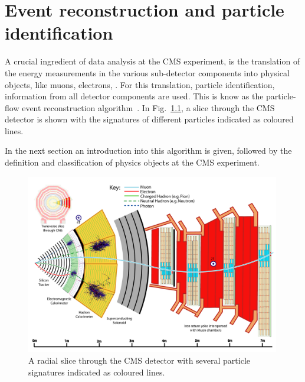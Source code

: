 \chapter{Event reconstruction and particle identification}
A crucial ingredient of data analysis at the CMS experiment, is the translation of the energy measurements in the various sub-detector components into physical objects, like muons, electrons, \etc.
For this translation, \ie particle identification, information from all detector components are used.
This is know as the particle-flow event reconstruction algorithm~\cite{CMS-PAS-PFT-09-001}.
In Fig.~\ref{fig:CMSslice}, a slice through the CMS detector is shown with the signatures of different particles indicated as coloured lines.

In the next section an introduction into this algorithm is given, followed by the definition and classification of physics objects at the CMS experiment.

\begin{figure}[!ht]
  \centering
      \includegraphics[width=0.99\textwidth]{figures/experiment/ObjectReconstruction/slice_white.pdf}
  \caption{A radial slice through the CMS detector with several particle signatures indicated as coloured lines.}  
  \label{fig:CMSslice}
\end{figure}


